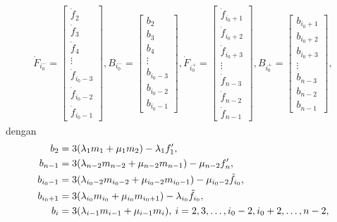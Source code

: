 \begin{align}\label{splReg2}
    \dot{F}_{i_0^-}=
    \begin{bmatrix}
        \dot{f}_2\\
        \dot{f}_3\\
        \dot{f}_4\\
        \vdots\\
        \dot{f}_{i_0-3}\\
        \dot{f}_{i_0-2}\\
        \dot{f}_{i_0-1}
    \end{bmatrix},
    B_{i_0^-}=
    \begin{bmatrix}
        b_2\\
        b_3\\
        b_4\\
        \vdots\\
        b_{i_0-3}\\
        b_{i_0-2}\\
        b_{i_0-1}
    \end{bmatrix},
    \dot{F}_{i_0^+}=
    \begin{bmatrix}
        \dot{f}_{i_0+1}\\
        \dot{f}_{i_0+2}\\
        \dot{f}_{i_0+3}\\
        \vdots\\
        \dot{f}_{n-3}\\
        \dot{f}_{n-2}\\
        \dot{f}_{n-1}
    \end{bmatrix},
    B_{i_0^+}=
    \begin{bmatrix}
        b_{i_0+1}\\
        b_{i_0+2}\\
        b_{i_0+3}\\
        \vdots\\
        b_{n-3}\\
        b_{n-2}\\
        b_{n-1}
    \end{bmatrix},
\end{align}
dengan
\begin{align}\label{splReg3}
\begin{split}
    b_2 &= 3(\lambda_1m_1 + \mu_1m_2) - \lambda_1f_1',\\
    b_{n-1} &= 3(\lambda_{n-2}m_{n-2} + \mu_{n-2}m_{n-1}) - \mu_{n-2}f_n',\\
    b_{i_0-1} &= 3(\lambda_{i_0-2}m_{i_0-2} + \mu_{i_0-2}m_{i_0-1}) - \mu_{i_0-2}\Tilde{f}_{i_0},\\
    b_{i_0+1} &= 3(\lambda_{i_0}m_{i_0} + \mu_{i_0}m_{i_0+1}) - \lambda_{i_0}\Tilde{f}_{i_0},\\
    b_i &= 3(\lambda_{i-1}m_{i-1} + \mu_{i-1}m_i), \: i=2,3,\dots,i_0-2,i_0+2,\dots,n-2,
\end{split}
\end{align}

